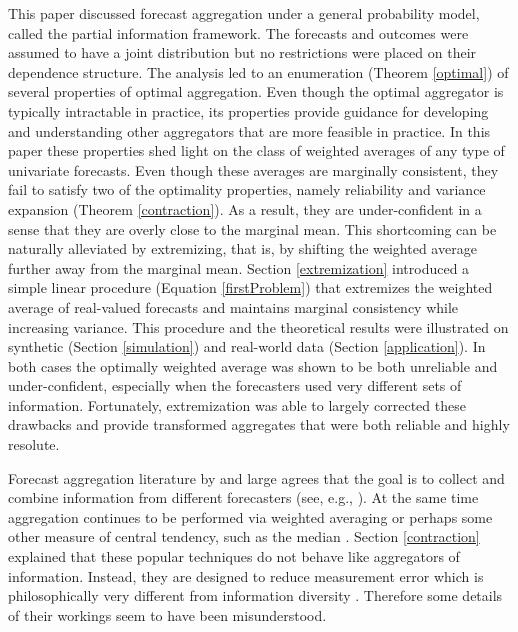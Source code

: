 \documentclass[11pt]{article}
\theoremstyle{definition}
\theoremstyle{definition}
\begin{document}
This paper discussed forecast aggregation under a general probability model, called the partial information framework. The forecasts and outcomes were assumed to have a joint distribution but no restrictions were placed on their dependence structure. The analysis led to an enumeration (Theorem \ref{optimal}) of several properties of optimal aggregation. Even though the optimal aggregator is typically intractable in practice, its properties provide guidance for developing and understanding other aggregators that are more feasible in practice. In this paper these properties shed light on the class of weighted averages of any type of univariate forecasts. Even though these averages are marginally consistent, they fail to satisfy two of the optimality properties, namely reliability and variance expansion (Theorem \ref{contraction}). As a result, they are under-confident in a sense that they are overly close to the marginal mean. This shortcoming can be naturally alleviated by extremizing, that is, by shifting the weighted average further away from the marginal mean.  Section \ref{extremization} introduced a simple linear procedure (Equation \ref{firstProblem}) that extremizes the weighted average of real-valued forecasts and maintains marginal consistency while increasing variance. This procedure and the theoretical results were illustrated on synthetic (Section \ref{simulation}) and real-world data (Section \ref{application}). In both cases the optimally weighted average was shown to be both unreliable and under-confident, especially when the forecasters used very different sets of information. Fortunately, extremization was able to largely corrected these drawbacks and provide transformed aggregates that were both reliable and highly resolute. 

Forecast aggregation literature by and large agrees that the goal is to collect and combine  information from different forecasters (see, e.g., \citealt{forlines2012heuristics, armstrong2, dawid1995coherent}). At the same time aggregation continues to be performed via weighted averaging or perhaps some other measure of central tendency, such as the median \citep{armstrong2, levins1966strategy, lobo2010human}. Section \ref{contraction} explained that these popular techniques do not behave like aggregators of information. Instead, they are designed to reduce measurement error which is philosophically very different from information diversity \citep{satopaamodeling2}. Therefore some details of their workings seem to have been misunderstood.
\end{document}
